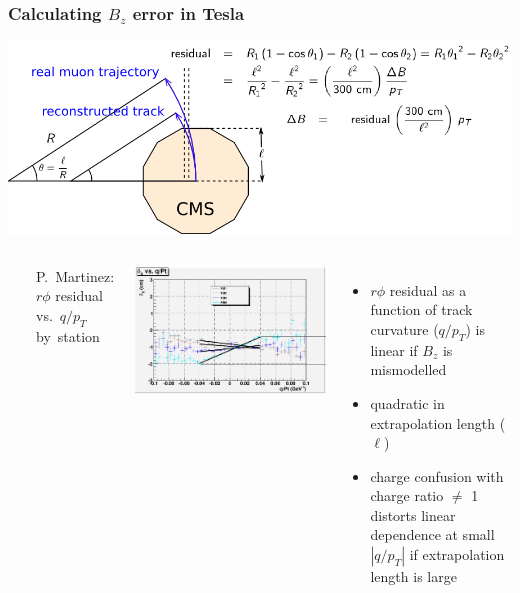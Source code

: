 \documentclass[compress]{beamer}
\begin{document}
\begin{frame}
\frametitle{Calculating $B_z$ error in Tesla}

\vspace{0.3 cm}
\includegraphics[width=\linewidth]{geometry.png}

\begin{columns}
\mbox{ }

\scriptsize P.\ Martinez: $r\phi$ residual vs.\ $q/p_T$ \mbox{by station\hspace{-1 cm}}

\vspace{0.05 cm}
\includegraphics[width=\linewidth]{pmartinez.png}


\vspace{-3.2 cm}
\begin{itemize}
\item $r\phi$ residual as a function of track curvature ($q/p_T$) is linear if $B_z$ is mismodelled
\item quadratic in extrapolation length ($\ell$)
\item charge confusion with charge ratio $\ne$ 1 distorts linear dependence at small $|q/p_T|$ if extrapolation length is large


\end{itemize}
\end{columns}
\end{frame}
\end{document}
